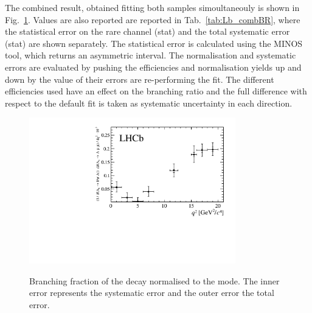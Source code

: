 




The combined result, obtained fitting both samples simoultaneouly is shown in Fig.~\ref{fig:Lb_combBR}.
Values are also reported are reported in Tab.~\ref{tab:Lb_combBR}, where the statistical
error on the rare channel (stat) and the total systematic error (stat) are shown separately.
The statistical error is calculated using the MINOS tool, which returns an asymmetric interval.
The normalisation and systematic errors are evaluated by pushing the efficiencies and normalisation yields
up and down by the value of their errors are re-performing the fit. %
The different efficiencies used have an effect on the branching ratio and the full difference with respect to the default 
fit is taken as systematic uncertainty in each direction.


 \begin{figure}[tbph]
 \centering
\includegraphics[width=0.8\textwidth]{Lmumu/figs/combined_result_2err.pdf}
\caption{Branching fraction of the \decay{\Lb}{\Lz\mumu} decay
  normalised to the \decay{\Lb}{\jpsi\Lz} mode. The inner error
  represents the systematic error and the outer error the total
  error.} 
   \protect\label{fig:Lb_combBR}
 \end{figure}

